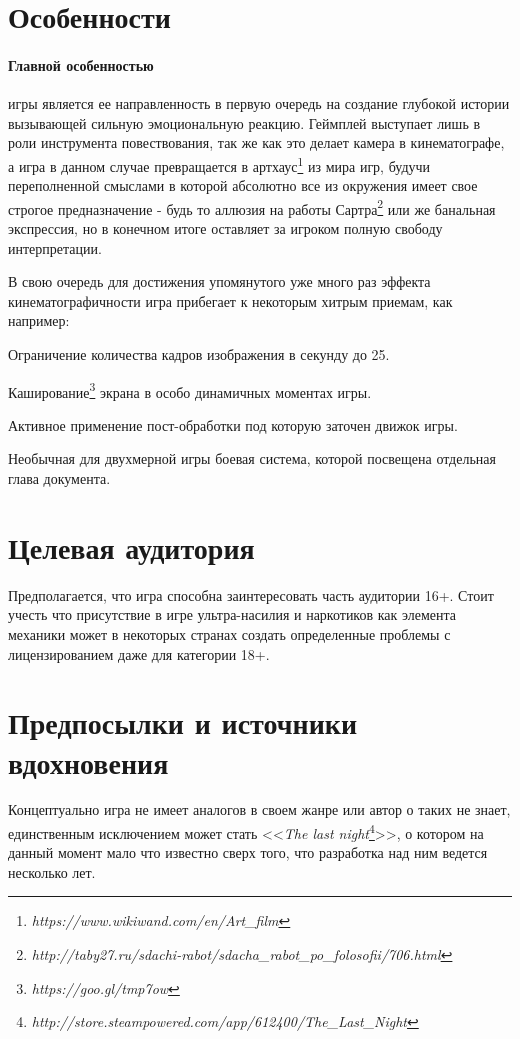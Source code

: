 \documentclass[11pt]{report}
\newenvironment{itemize*}%
  {\begin{itemize}%
    \setlength{\itemsep}{2pt}%
    \setlength{\parskip}{0.75pt}}%
  {\end{itemize}}
\begin{document}
\section{Особенности}
\paragraph{Главной особенностью} игры является ее направленность в первую очередь на создание глубокой истории вызывающей сильную эмоциональную реакцию. Геймплей  выступает лишь в роли инструмента повествования, так же как это делает камера в кинематографе, а  
игра в данном случае превращается в артхаус\footnote{\emph{https://www.wikiwand.com/en/Art\_film}} из мира игр, будучи переполненной смыслами в которой абсолютно все из окружения имеет свое строгое предназначение - будь то аллюзия на работы Сартра\footnote{\emph{http://taby27.ru/sdachi-rabot/sdacha\_rabot\_po\_folosofii/706.html}} или же банальная экспрессия, но в конечном итоге оставляет за игроком полную свободу интерпретации. 

В свою очередь для достижения упомянутого уже много раз эффекта кинематографичности игра прибегает к некоторым хитрым приемам, как например:\begin{itemize*}
\item Ограничение количества кадров изображения в секунду до 25.
\item Каширование\footnote{\emph{https://goo.gl/tmp7ow}} экрана в особо динамичных моментах игры.
\item Активное применение пост-обработки под которую заточен движок игры.
\item Необычная для двухмерной игры боевая система, которой посвещена отдельная глава документа.\\
\end{itemize*}


\section{Целевая аудитория}
Предполагается, что игра способна заинтересовать часть аудитории 16+. Стоит учесть что присутствие в игре ультра-насилия и наркотиков как элемента механики может в некоторых странах создать определенные проблемы с лицензированием даже для категории 18+. \\ 


\section{Предпосылки и источники вдохновения}
Концептуально игра не имеет аналогов в своем жанре или автор о таких не знает, единственным исключением может стать <<\textit{The last night}\footnote{\emph{http://store.steampowered.com/app/612400/The\_Last\_Night}}>>, о котором на данный момент мало что известно сверх того, что разработка над ним ведется несколько лет.
\end{document}
